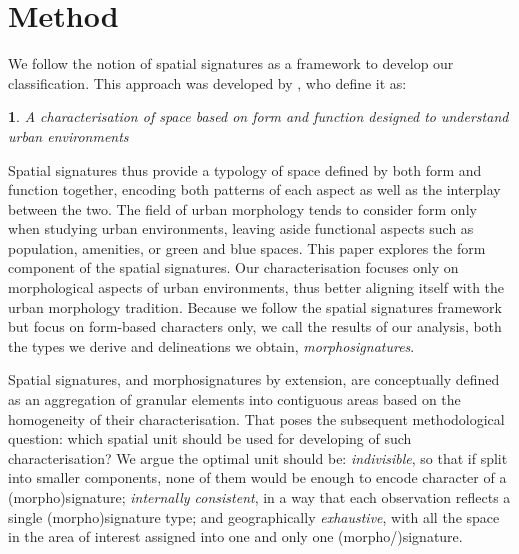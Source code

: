 \section{Method}
\label{sec:meth}

We follow the notion of spatial signatures as a framework
to develop our classification.
This approach was developed by \cite{dab_mf_2021}, who define it as:

\newtheorem*{theorem}{}
\begin{theorem}
    A characterisation of space based on form and function designed to understand urban
environments
\end{theorem}

Spatial signatures thus provide a typology of space defined by both form and function
together, encoding both patterns of each aspect as well as the interplay between the two. 
The field of urban morphology tends to consider form only when studying urban
environments, leaving aside functional aspects such as population, amenities,
or green and blue spaces. 
%
This paper explores the form component of the spatial signatures.
Our characterisation focuses only on morphological aspects of urban
environments, thus better aligning itself with the urban morphology tradition.
Because we follow the spatial signatures framework but focus on form-based
characters only, we call the results of our analysis, both the types we derive
and delineations we obtain, \textit{morphosignatures}.

Spatial signatures, and morphosignatures by extension, are conceptually defined as an aggregation of granular elements into
contiguous areas based on the homogeneity of their characterisation. That
poses the subsequent methodological question: which spatial unit should be
used for developing of such characterisation? We argue the optimal unit should
be: \textit{indivisible}, so that if split into
smaller components, none of them would be enough to encode character of a
(morpho)signature;
\textit{internally consistent}, in a way that each observation reflects a single (morpho)signature type;
and geographically \textit{exhaustive}, with all the space in the area of
interest assigned into one and only one (morpho/)signature.

